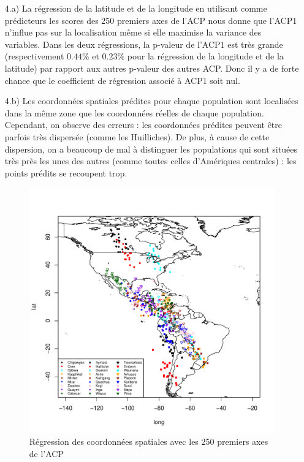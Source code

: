 \documentclass[a4paper, 12pt]{article}
\begin{document}
\begin{enumerate}
\setlength{\itemsep}{12pt}

\item[4.a)]
La régression de la latitude et de la longitude en utilisant comme prédicteurs les scores des 250 premiers axes de l'ACP nous donne que l'ACP1 n'influe pas sur la localisation même si elle maximise la variance des variables. Dans les deux régressions, la p-valeur de l'ACP1 est très grande (respectivement $0.44\%$ et $0.23\%$ pour la régression de la longitude et de la latitude) par rapport aux autres p-valeur des autres ACP. Donc il y a de forte chance que le coefficient de régression associé à ACP1 soit nul. 

\item[4.b)] 
Les coordonnées spatiales prédites pour chaque population sont localisées dans la même zone que les coordonnées réelles de chaque population. Cependant, on observe des erreurs : les coordonnées prédites peuvent être parfois très dispersée (comme les Huilliches). De plus, à cause de cette dispersion, on a beaucoup de mal à distinguer les populations qui sont situées très près les unes des autres (comme toutes celles d'Amériques centrales) : les points prédits se recoupent trop.

\begin{figure}[!h]
\begin{center}
\includegraphics[scale=1]{map_acp.pdf}
\caption{Régression des coordonnées spatiales avec les 250 premiers axes de l'ACP}
\end{center}
\end{figure}


\end{enumerate}
\end{document}
